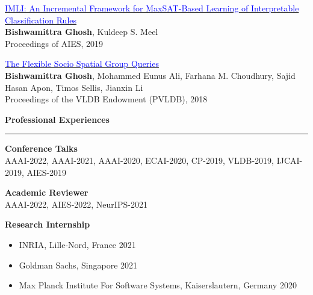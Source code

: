 \documentclass[a4paper,10pt,final]{article}
\newcommand{\Sep}{\vspace{1.5em}}
\newcommand{\SmallSep}{\vspace{0.5em}}
\newcommand{\blue}[1]{\textcolor{blue}{#1}}
\begin{document}
\begin{etaremune}
		\item \href{https://bishwamittra.github.io/publication/imli-ghosh.pdf}{\blue{IMLI: An Incremental Framework for MaxSAT-Based Learning of Interpretable Classification Rules}}\\
		\textbf{Bishwamittra Ghosh}, Kuldeep S. Meel\\
		Proceedings of AIES, 2019
		
		\item 	\href{https://bishwamittra.github.io/publication/fssgq-ghosh.pdf}{\blue{The Flexible Socio Spatial Group Queries}}\\
		\textbf{Bishwamittra Ghosh}, Mohammed Eunus Ali, Farhana M. Choudhury,
		Sajid Hasan Apon, Timos Sellis, Jianxin Li\\
		Proceedings of the VLDB Endowment (PVLDB), 2018
		
	\end{etaremune}





%

\Sep
\Large { \textbf{Professional Experiences}}\\
\noindent\rule{\textwidth}{1pt}
\normalsize
\textbf{Conference Talks}\\
AAAI-2022, AAAI-2021, AAAI-2020, ECAI-2020, CP-2019, VLDB-2019, IJCAI-2019, AIES-2019

\SmallSep
\textbf{Academic Reviewer}\\
AAAI-2022, AIES-2022, NeurIPS-2021

\SmallSep
\textbf{Research Internship}
\begin{itemize}
	\item INRIA, Lille-Nord, France \hspace*{\fill}2021
	\item Goldman Sachs, Singapore \hspace*{\fill}2021
	\item  Max Planck Institute For Software Systems, Kaiserslautern, Germany \hspace*{\fill}2020
\end{itemize}
\end{document}
